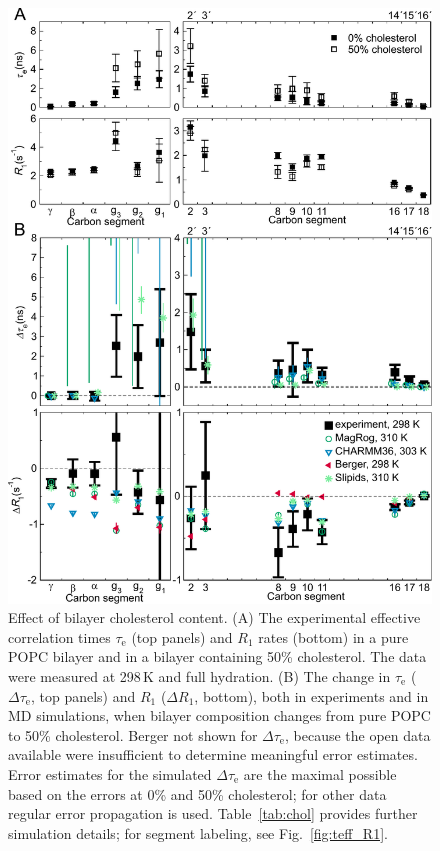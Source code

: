 \documentclass[journal=jpcbfk,manuscript=article,layout=twocolumn]{achemso}
\begin{document}
\begin{figure}[h!]
	\centering
	\includegraphics[width=\columnwidth]{./figures/cholesterol.pdf}  
	\caption{Effect of bilayer cholesterol content.
	(A) The experimental effective correlation times $\tau_\mathrm{e}$ (top panels) and $R_{1}$ rates (bottom) in a pure POPC bilayer and in a bilayer containing 50\% cholesterol. The data were measured at 298\,K and full hydration.
	(B) The change in $\tau_\mathrm{e}$ ($\Delta\tau_\mathrm{e}$, top panels) and $R_{1}$ ($\Delta R_{1}$, bottom),
	both in experiments and in MD simulations, when bilayer composition changes from pure POPC to 50\% cholesterol.
	Berger not shown for $\Delta\tau_\mathrm{e}$, because the open data available were insufficient to determine meaningful error estimates.
	Error estimates for the simulated $\Delta\tau_\mathrm e$ are the maximal possible
	based on the errors at 0\% and 50\% cholesterol;
	for other data regular error propagation is used.
	Table~\ref{tab:chol} provides further simulation details;
	for segment labeling, see Fig.~\ref{fig:teff_R1}.
	}
	\label{fig:chol}
\end{figure}
\end{document}
